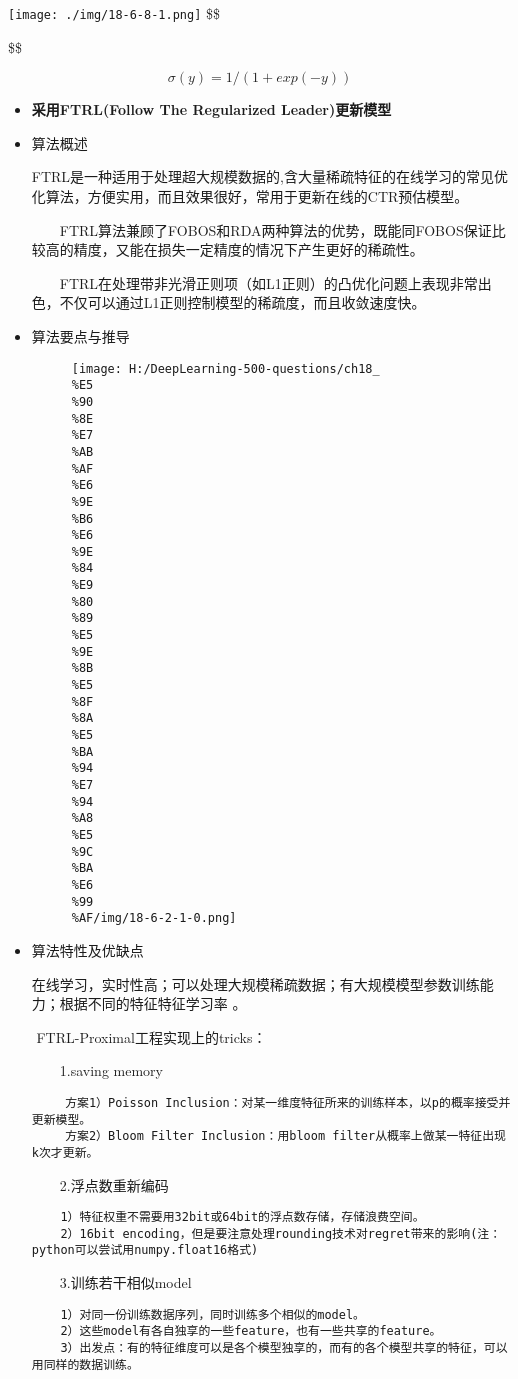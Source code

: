 \texttt{[image: ./img/18-6-8-1.png]} \$\$

\$\$

\[
  𝜎(𝑦)=1/(1+exp⁡(−𝑦))
  \]

\begin{itemize}
\item
  \textbf{采用FTRL(Follow The Regularized Leader)更新模型}
\item
  算法概述

  ​
  FTRL是一种适用于处理超大规模数据的,含大量稀疏特征的在线学习的常见优化算法，方便实用，而且效果很好，常用于更新在线的CTR预估模型。

  　　FTRL算法兼顾了FOBOS和RDA两种算法的优势，既能同FOBOS保证比较高的精度，又能在损失一定精度的情况下产生更好的稀疏性。

  　　FTRL在处理带非光滑正则项（如L1正则）的凸优化问题上表现非常出色，不仅可以通过L1正则控制模型的稀疏度，而且收敛速度快。
\item
  算法要点与推导

  \begin{figure}
  \centering
  \texttt{[image: H:/DeepLearning-500-questions/ch18\_\\\%E5\\\%90\\\%8E\\\%E7\\\%AB\\\%AF\\\%E6\\\%9E\\\%B6\\\%E6\\\%9E\\\%84\\\%E9\\\%80\\\%89\\\%E5\\\%9E\\\%8B\\\%E5\\\%8F\\\%8A\\\%E5\\\%BA\\\%94\\\%E7\\\%94\\\%A8\\\%E5\\\%9C\\\%BA\\\%E6\\\%99\\\%AF/img/18-6-2-1-0.png]}
  \caption{}
  \end{figure}
\item
  算法特性及优缺点

  ​
  在线学习，实时性高；可以处理大规模稀疏数据；有大规模模型参数训练能力；根据不同的特征特征学习率
  。

  ​ FTRL-Proximal工程实现上的tricks：

  　　1.saving memory

\begin{verbatim}
　   方案1）Poisson Inclusion：对某一维度特征所来的训练样本，以p的概率接受并更新模型。
　   方案2）Bloom Filter Inclusion：用bloom filter从概率上做某一特征出现k次才更新。
\end{verbatim}

  　　2.浮点数重新编码

\begin{verbatim}
    1）特征权重不需要用32bit或64bit的浮点数存储，存储浪费空间。
    2）16bit encoding，但是要注意处理rounding技术对regret带来的影响(注：python可以尝试用numpy.float16格式)
\end{verbatim}

  　　3.训练若干相似model

\begin{verbatim}
    1）对同一份训练数据序列，同时训练多个相似的model。
    2）这些model有各自独享的一些feature，也有一些共享的feature。
    3）出发点：有的特征维度可以是各个模型独享的，而有的各个模型共享的特征，可以用同样的数据训练。
\end{verbatim}


\end{itemize}
